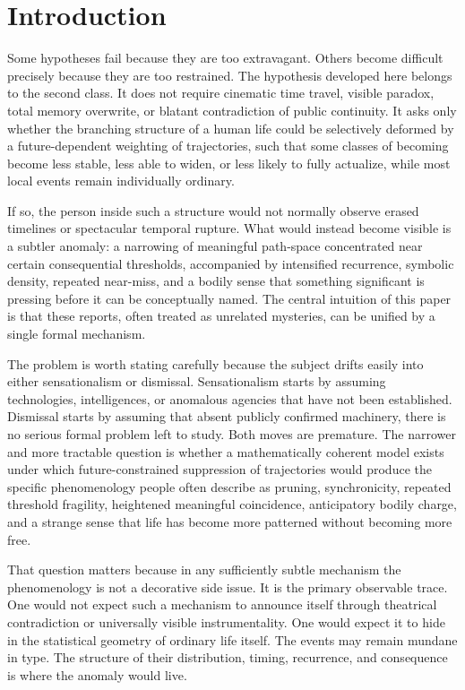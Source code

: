 \documentclass[12pt]{article}
\begin{document}
\section{Introduction}

Some hypotheses fail because they are too extravagant. Others become difficult precisely because they are too restrained. The hypothesis developed here belongs to the second class. It does not require cinematic time travel, visible paradox, total memory overwrite, or blatant contradiction of public continuity. It asks only whether the branching structure of a human life could be selectively deformed by a future-dependent weighting of trajectories, such that some classes of becoming become less stable, less able to widen, or less likely to fully actualize, while most local events remain individually ordinary.

If so, the person inside such a structure would not normally observe erased timelines or spectacular temporal rupture. What would instead become visible is a subtler anomaly: a narrowing of meaningful path-space concentrated near certain consequential thresholds, accompanied by intensified recurrence, symbolic density, repeated near-miss, and a bodily sense that something significant is pressing before it can be conceptually named. The central intuition of this paper is that these reports, often treated as unrelated mysteries, can be unified by a single formal mechanism.

The problem is worth stating carefully because the subject drifts easily into either sensationalism or dismissal. Sensationalism starts by assuming technologies, intelligences, or anomalous agencies that have not been established. Dismissal starts by assuming that absent publicly confirmed machinery, there is no serious formal problem left to study. Both moves are premature. The narrower and more tractable question is whether a mathematically coherent model exists under which future-constrained suppression of trajectories would produce the specific phenomenology people often describe as pruning, synchronicity, repeated threshold fragility, heightened meaningful coincidence, anticipatory bodily charge, and a strange sense that life has become more patterned without becoming more free.

That question matters because in any sufficiently subtle mechanism the phenomenology is not a decorative side issue. It is the primary observable trace. One would not expect such a mechanism to announce itself through theatrical contradiction or universally visible instrumentality. One would expect it to hide in the statistical geometry of ordinary life itself. The events may remain mundane in type. The structure of their distribution, timing, recurrence, and consequence is where the anomaly would live.
\end{document}
